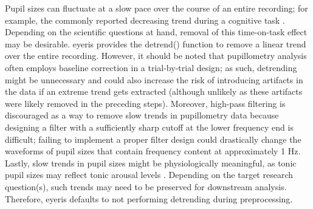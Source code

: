 Pupil sizes can fluctuate at a slow pace over the course of an entire recording; for example, the commonly reported decreasing trend during a cognitive task \parencite[a.k.a., the ``time-on-task effect'';][]{beatty1982phasic,hopstaken2015multifaceted,martin2022pupillometry,massar2016rewards,steinhauer2022publication,unsworth2016pupillary,zhao2019pupillometry}. Depending on the scientific questions at hand, removal of this time-on-task effect may be desirable. eyeris provides the detrend() function to remove a linear trend over the entire recording. However, it should be noted that pupillometry analysis often employs baseline correction in a trial-by-trial design; as such, detrending might be unnecessary and could also increase the risk of introducing artifacts in the data if an extreme trend gets extracted (although unlikely as these artifacts were likely removed in the preceding steps). Moreover, high-pass filtering is discouraged as a way to remove slow trends in pupillometry data because designing a filter with a sufficiently sharp cutoff at the lower frequency end is difficult; failing to implement a proper filter design could drastically change the waveforms of pupil sizes that contain frequency content at approximately 1 Hz. Lastly, slow trends in pupil sizes might be physiologically meaningful, as tonic pupil sizes may reflect tonic arousal levels \parencite{astonjones2005integrative,groot2021probing,joshi2020pupil,madore2020memory,madore2022readiness,murphy2011pupillometry,schwartz2025attending,smallwood2012insulation,tsukahara2016relationship,unsworth2018tracking}. Depending on the target research question(s), such trends may need to be preserved for downstream analysis. Therefore, eyeris defaults to not performing detrending during preprocessing.

